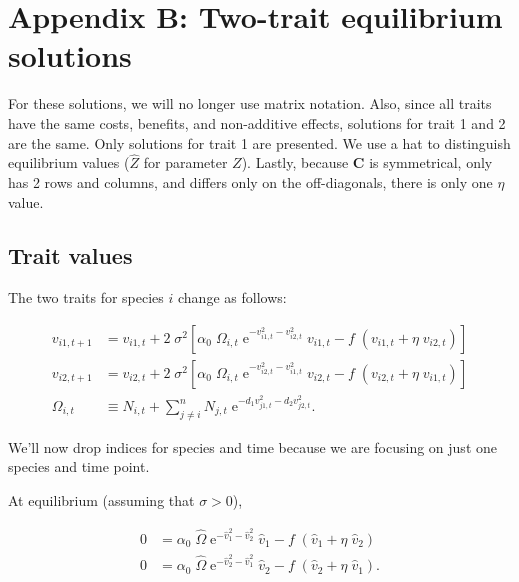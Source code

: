 \section*{Appendix B: Two-trait equilibrium solutions}

\renewcommand{\thefigure}{B\arabic{figure}}
\renewcommand{\theequation}{B\arabic{equation}}
\renewcommand{\thetable}{B\arabic{table}}
\setcounter{equation}{0}
\setcounter{figure}{0}
\setcounter{table}{0}


For these solutions, we will no longer use matrix notation.
Also, since all traits have the same costs, benefits, and
non-additive effects, solutions for trait 1 and 2 are the same.
Only solutions for trait 1 are presented.
We use a hat to distinguish equilibrium values
($\hat{Z}$ for parameter $Z$).
Lastly, because $\mathbf{C}$ is symmetrical, only has 2 rows and columns, and
differs only on the off-diagonals, there is only one $\eta$ value.


\subsection*{Trait values}

The two traits for species $i$ change as follows:

\begin{equation*}
\begin{split}
    v_{i1,t+1} &= v_{i1,t} + 2 \; \sigma^2
    \left[
        \alpha_0 \; \Omega_{i,t} \;
            \textrm{e}^{-v_{i1,t}^2 - v_{i2,t}^2} \; v_{i1,t}
        - f \; ( v_{i1,t} + \eta \; v_{i2,t} )
    \right] \\
    v_{i2,t+1} &= v_{i2,t} + 2 \; \sigma^2
    \left[
        \alpha_0 \; \Omega_{i,t} \;
            \textrm{e}^{-v_{i2,t}^2 - v_{i1,t}^2} \; v_{i2,t}
        - f \; ( v_{i2,t} + \eta \; v_{i1,t} )
    \right] \\
    \Omega_{i,t} &\equiv N_{i,t} +
        \sum_{j \ne i}^{n}{ N_{j,t} \; \textrm{e}^{
                - d_1 v_{j1,t}^2 - d_2 v_{j2,t}^2 } }
    \textrm{.}
\end{split}
\end{equation*}


We'll now drop indices for species and time because we are
focusing on just one species and time point.


At equilibrium (assuming that $\sigma > 0$),

\begin{equation}
\begin{split}
    0 &= \alpha_0 \; \hat{\Omega} \;
            \textrm{e}^{-\hat{v}_{1}^2 - \hat{v}_{2}^2} \; \hat{v}_{1}
        - f \; ( \hat{v}_{1} + \eta \; \hat{v}_{2} ) \\
    0 &=
        \alpha_0 \; \hat{\Omega} \;
            \textrm{e}^{-\hat{v}_{2}^2 - \hat{v}_{1}^2} \; \hat{v}_{2}
        - f \; ( \hat{v}_{2} + \eta \; \hat{v}_{1} )
    \textrm{.}
\end{split}
\label{eq:two-traits-v-eq1}
\end{equation}


